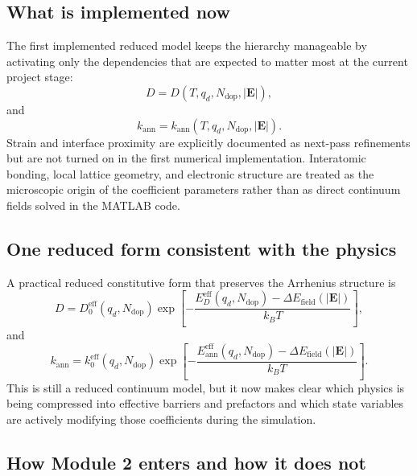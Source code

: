 \documentclass[11pt]{article}
\begin{document}
\subsection{What is implemented now}

The first implemented reduced model keeps the hierarchy manageable by activating only the dependencies that are expected to matter most at the current project stage:
\begin{equation}
D = D\left(T, q_d, N_{\mathrm{dop}}, |\mathbf{E}|\right),
\end{equation}
and
\begin{equation}
k_{\mathrm{ann}} = k_{\mathrm{ann}}\left(T, q_d, N_{\mathrm{dop}}, |\mathbf{E}|\right).
\end{equation}
Strain and interface proximity are explicitly documented as next-pass refinements but are not turned on in the first numerical implementation. Interatomic bonding, local lattice geometry, and electronic structure are treated as the microscopic origin of the coefficient parameters rather than as direct continuum fields solved in the MATLAB code.

\subsection{One reduced form consistent with the physics}

A practical reduced constitutive form that preserves the Arrhenius structure is
\begin{equation}
D = D_0^{\mathrm{eff}}(q_d, N_{\mathrm{dop}})
\exp\left[-\frac{E_D^{\mathrm{eff}}(q_d, N_{\mathrm{dop}}) - \Delta E_{\mathrm{field}}(|\mathbf{E}|)}{k_B T}\right],
\end{equation}
and
\begin{equation}
k_{\mathrm{ann}} = k_0^{\mathrm{eff}}(q_d, N_{\mathrm{dop}})
\exp\left[-\frac{E_{\mathrm{ann}}^{\mathrm{eff}}(q_d, N_{\mathrm{dop}}) - \Delta E_{\mathrm{field}}(|\mathbf{E}|)}{k_B T}\right].
\end{equation}
This is still a reduced continuum model, but it now makes clear which physics is being compressed into effective barriers and prefactors and which state variables are actively modifying those coefficients during the simulation.

\subsection{How Module 2 enters and how it does not}
\end{document}
